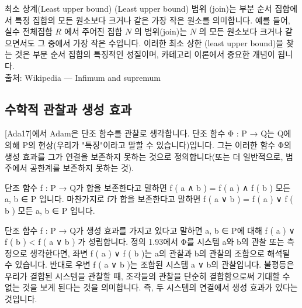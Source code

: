 \documentclass[11pt, a4paper, twoside, openany]{book}
\begin{document}
\begin{deepresearch}{최소 상계(Least upper bound)  (Least upper bound)}
범위 (join)는 부분 순서 집합에서 특정 집합의 모든 원소보다 크거나 같은 가장 작은 원소를 의미합니다.  예를 들어, 실수 전체집합 $R$ 에서 주어진 집합 $N$ 의 범위(join)는 $N$ 의 모든 원소보다 크거나 같으면서도 그 중에서 가장 작은 수입니다. 이러한 최소 상한 (least upper bound)을 찾는 것은 부분 순서 집합의 특징적인 성질이며, 카테고리 이론에서 중요한 개념이 됩니다.
\\[4pt]{\footnotesize\color{ctgray} 출처: Wikipedia — Infimum and supremum}
\end{deepresearch}


\subsection{수학적 관찰과 생성 효과}
\label{sec:1-3-2}

[Ada17]에서 Adam\hspace{0pt}은 단조 함수를 관찰로 생각합니다. 단조 함수 Φ : P → Q\hspace{0pt}는 Q\hspace{0pt}에 의해 P\hspace{0pt}의 현상(우리가 "특징"이라고 말할 수 있습니다)입니다. 그는 이러한 함수 Φ의 생성 효과를 그가 연결을 보존하지 못하는 것으로 정의합니다(또는 더 일반적으로, 범주에서 공한계를 보존하지 못하는 것).

\par\medskip
\begin{definitionbox}[정의 1.92.]
단조 함수 f : P → Q\hspace{0pt}가 합을 보존한다고 말하면 f ( a ∧ b ) = f ( a ) ∧ f ( b ) 모든 a, b ∈ P 입니다. 마찬가지로 f\hspace{0pt}가 합을 보존한다고 말하면 f ( a ∨ b ) = f ( a ) ∨ f ( b ) 모든 a, b ∈ P 입니다.
\end{definitionbox}

\par\medskip
\begin{definitionbox}[정의 1.93.]
단조 함수 f : P → Q\hspace{0pt}가 생성 효과를 가지고 있다고 말하면 a, b ∈ P\hspace{0pt}에 대해 f ( a ) ∨ f ( b ) < f ( a ∨ b ) 가 성립합니다. 정의 1.93\hspace{0pt}에서 Φ를 시스템 a\hspace{0pt}와 b\hspace{0pt}의 관찰 또는 측정으로 생각한다면, 좌변 f ( a ) ∨ f ( b )는 a\hspace{0pt}의 관찰과 b\hspace{0pt}의 관찰의 조합으로 해석될 수 있습니다. 반대로 우변 f ( a ∨ b )는 조합된 시스템 a ∨ b\hspace{0pt}의 관찰입니다. 불평등은 우리가 결합된 시스템을 관찰할 때, 조각들의 관찰을 단순히 결합함으로써 기대할 수 없는 것을 보게 된다는 것을 의미합니다. 즉, 두 시스템의 연결에서 생성 효과가 있다는 것입니다.
\end{definitionbox}
\end{document}
